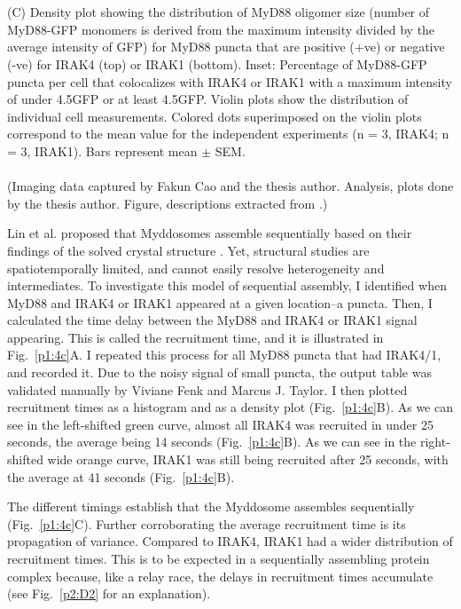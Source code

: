 \begin{centering}
{\\
\\
(C) Density plot showing the distribution of MyD88 oligomer size (number of MyD88-GFP monomers is derived from the maximum intensity divided by the average intensity of GFP) for MyD88 puncta that are positive (+ve) or negative (-ve) for IRAK4 (top) or IRAK1 (bottom). Inset: Percentage of MyD88-GFP puncta per cell that colocalizes with IRAK4 or IRAK1 with a maximum intensity of under 4.5\times GFP or at least 4.5\times GFP. Violin plots show the distribution of individual cell measurements. Colored dots superimposed on the violin plots correspond to the mean value for the independent experiments (n = 3, IRAK4; n = 3, IRAK1). Bars represent mean $\pm$ SEM.
\\
\\
(Imaging data captured by Fakun Cao and the thesis author. Analysis, plots done by the thesis author. Figure, descriptions extracted from \autocite{Deliz-Aguirre_2021}.)}
\label{p1:4b}
\end{centering}

Lin et al. proposed that Myddosomes assemble sequentially based on their findings of the solved crystal structure \autocite{Lin_2010}. Yet, structural studies are spatiotemporally limited, and cannot easily resolve heterogeneity and intermediates. To investigate this model of sequential assembly, I identified when MyD88 and IRAK4 or IRAK1 appeared at a given location--a puncta. Then, I calculated the time delay between the MyD88 and IRAK4 or IRAK1 signal appearing. This is called the recruitment time, and it is illustrated in Fig.~\ref{p1:4c}A. I repeated this process for all MyD88 puncta that had IRAK4/1, and recorded it. Due to the noisy signal of small puncta, the output table was validated manually by Viviane Fenk and Marcus J. Taylor. I then plotted recruitment times as a histogram and as a density plot (Fig.~\ref{p1:4c}B). As we can see in the left-shifted green curve, almost all IRAK4 was recruited in under 25 seconds, the average being 14 seconds (Fig.~\ref{p1:4c}B). As we can see in the right-shifted wide orange curve, IRAK1 was still being recruited after 25 seconds, with the average at 41 seconds (Fig.~\ref{p1:4c}B).

The different timings establish that the Myddosome assembles sequentially (Fig.~\ref{p1:4c}C). Further corroborating the average recruitment time is its propagation of variance. Compared to IRAK4, IRAK1 had a wider distribution of recruitment times. This is to be expected in a sequentially assembling protein complex because, like a relay race, the delays in recruitment times accumulate (see Fig.~\ref{p2:D2} for an explanation).

